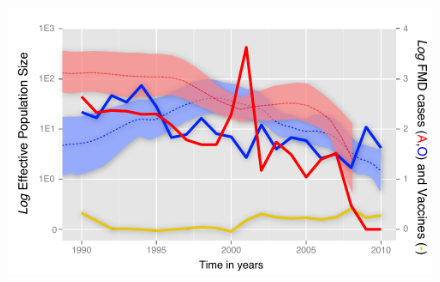 \documentclass[10pt]{article}
\begin{document}
\newpage
\begin{figure}[H]
\begin{center}
\includegraphics[scale=1.0]{FIGURES/skyride.pdf}
\end{center}
\caption{}
\label{fig:skyride}
\end{figure}
\newpage
\end{document}
